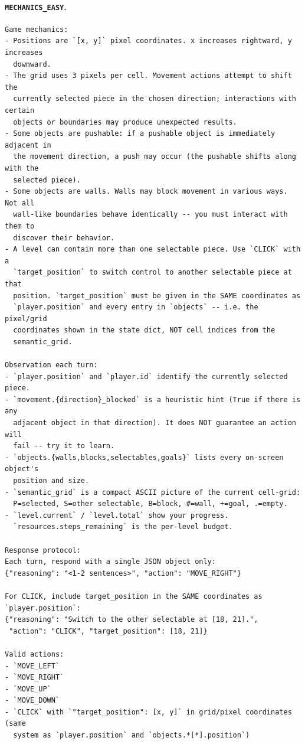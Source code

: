 \documentclass{article}
\begin{document}
\paragraph{\texttt{MECHANICS\_EASY}.}
\begin{verbatim}
Game mechanics:
- Positions are `[x, y]` pixel coordinates. x increases rightward, y increases
  downward.
- The grid uses 3 pixels per cell. Movement actions attempt to shift the
  currently selected piece in the chosen direction; interactions with certain
  objects or boundaries may produce unexpected results.
- Some objects are pushable: if a pushable object is immediately adjacent in
  the movement direction, a push may occur (the pushable shifts along with the
  selected piece).
- Some objects are walls. Walls may block movement in various ways. Not all
  wall-like boundaries behave identically -- you must interact with them to
  discover their behavior.
- A level can contain more than one selectable piece. Use `CLICK` with a
  `target_position` to switch control to another selectable piece at that
  position. `target_position` must be given in the SAME coordinates as
  `player.position` and every entry in `objects` -- i.e. the pixel/grid
  coordinates shown in the state dict, NOT cell indices from the
  semantic_grid.

Observation each turn:
- `player.position` and `player.id` identify the currently selected piece.
- `movement.{direction}_blocked` is a heuristic hint (True if there is any
  adjacent object in that direction). It does NOT guarantee an action will
  fail -- try it to learn.
- `objects.{walls,blocks,selectables,goals}` lists every on-screen object's
  position and size.
- `semantic_grid` is a compact ASCII picture of the current cell-grid:
  P=selected, S=other selectable, B=block, #=wall, +=goal, .=empty.
- `level.current` / `level.total` show your progress.
  `resources.steps_remaining` is the per-level budget.

Response protocol:
Each turn, respond with a single JSON object only:
{"reasoning": "<1-2 sentences>", "action": "MOVE_RIGHT"}

For CLICK, include target_position in the SAME coordinates as
`player.position`:
{"reasoning": "Switch to the other selectable at [18, 21].",
 "action": "CLICK", "target_position": [18, 21]}

Valid actions:
- `MOVE_LEFT`
- `MOVE_RIGHT`
- `MOVE_UP`
- `MOVE_DOWN`
- `CLICK` with `"target_position": [x, y]` in grid/pixel coordinates (same
  system as `player.position` and `objects.*[*].position`)
\end{verbatim}
\end{document}
